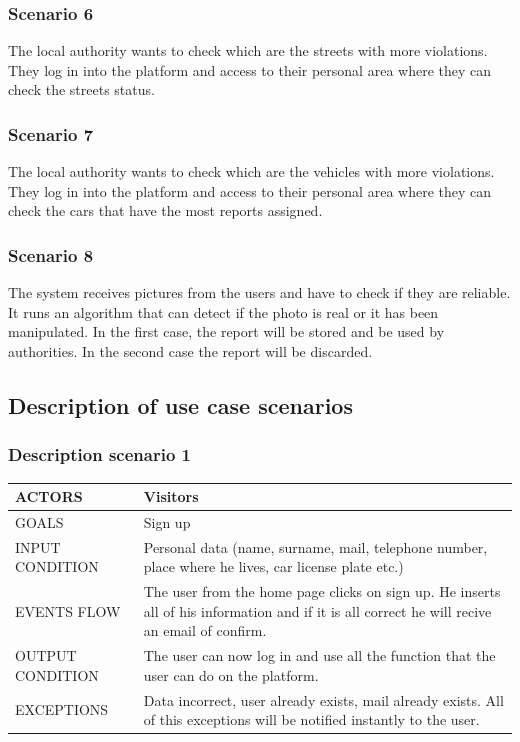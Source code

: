 \subsubsection{Scenario 6}
The local authority wants to check which are the streets with more violations. They log in into the platform and access to their personal area where they can check the streets status.
 
\subsubsection{Scenario 7}
The local authority wants to check which are the vehicles with more violations. They log in into the platform and access to their personal area where they can check the cars that have the most reports assigned.

\subsubsection{Scenario 8}
The system receives pictures from the users and have to check if they are reliable. It runs an algorithm that can detect if the photo is real or it has been manipulated. In the first case, the report will be stored and be used by authorities. In the second case the report will be discarded.


\subsection{Description of use case scenarios}
\subsubsection{Description scenario 1}


\begin{center}
	\begin{tabular}{ | l | p{6cm} | } 
		\hline
		ACTORS & Visitors  \\ 
		\hline
		GOALS & Sign up  \\ 
		\hline
		INPUT CONDITION & Personal data (name, surname, mail, telephone number, place where he lives, car license plate etc.)  \\ 
		\hline
		EVENTS FLOW & The user from the home page clicks on sign up. He inserts all of his information and if it is all correct he will recive an email of confirm.  \\ 
		\hline
		OUTPUT CONDITION & The user can now log in and use all the function that the user can do on the platform.  \\ 
		\hline
		EXCEPTIONS & Data incorrect, user already exists, mail already exists. All of this exceptions will be notified instantly to the user. \\ 
		\hline
	\end{tabular}
\end{center}

